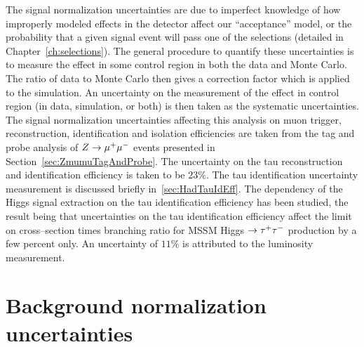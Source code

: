 The signal normalization uncertainties are due to imperfect knowledge of how
improperly modeled effects in the detector affect our ``acceptance'' model, or
the probability that a given signal event will pass one of the selections
(detailed in Chapter~\ref{ch:selections}).  The general procedure to quantify
these uncertainties is to measure the effect in some control region in both the
data and Monte Carlo.  The ratio of data to Monte Carlo then gives a correction
factor which is applied to the simulation.  An uncertainty on the measurement of
the effect in control region (in data, simulation, or both) is then taken as the
systematic uncertainties.  The signal normalization uncertainties affecting this
analysis on muon trigger, reconstruction, identification and isolation
efficiencies are taken from the tag and probe analysis of $Z \to \mu^+\mu^-$ events
presented in Section~\ref{sec:ZmumuTagAndProbe}.  The uncertainty on the tau
reconstruction and identification efficiency is taken to be $23\%$.  The tau
identification uncertainty measurement is discussed briefly
in~\ref{sec:HadTauIdEff}.  The dependency of the Higgs signal extraction on the
tau identification efficiency has been studied, the result being that
uncertainties on the tau identification efficiency affect the limit on
cross--section times branching ratio for MSSM Higgs $\to \tau^+\tau^-$ production by a
few percent only.  An uncertainty of $11\%$ is attributed to the luminosity
measurement.

\section{Background normalization uncertainties}

